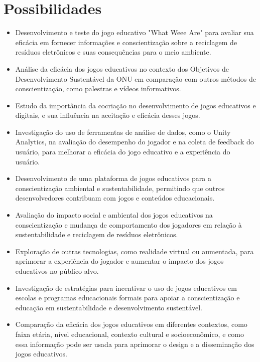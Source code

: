 \section{Possibilidades}
\begin{itemize}
    \item Desenvolvimento e teste do jogo educativo "What Weee Are" para avaliar sua eficácia em fornecer informações e conscientização sobre a reciclagem de resíduos eletrônicos e suas consequências para o meio ambiente.
    \item Análise da eficácia dos jogos educativos no contexto dos Objetivos de Desenvolvimento Sustentável da ONU em comparação com outros métodos de conscientização, como palestras e vídeos informativos.
    \item Estudo da importância da cocriação no desenvolvimento de jogos educativos e digitais, e sua influência na aceitação e eficácia desses jogos.
    \item Investigação do uso de ferramentas de análise de dados, como o Unity Analytics, na avaliação do desempenho do jogador e na coleta de feedback do usuário, para melhorar a eficácia do jogo educativo e a experiência do usuário.
    \item Desenvolvimento de uma plataforma de jogos educativos para a conscientização ambiental e sustentabilidade, permitindo que outros desenvolvedores contribuam com jogos e conteúdos educacionais.
    \item Avaliação do impacto social e ambiental dos jogos educativos na conscientização e mudança de comportamento dos jogadores em relação à sustentabilidade e reciclagem de resíduos eletrônicos.
    \item Exploração de outras tecnologias, como realidade virtual ou aumentada, para aprimorar a experiência do jogador e aumentar o impacto dos jogos educativos no público-alvo.
    \item Investigação de estratégias para incentivar o uso de jogos educativos em escolas e programas educacionais formais para apoiar a conscientização e educação em sustentabilidade e desenvolvimento sustentável.
    \item Comparação da eficácia dos jogos educativos em diferentes contextos, como faixa etária, nível educacional, contexto cultural e socioeconômico, e como essa informação pode ser usada para aprimorar o design e a disseminação dos jogos educativos.
\end{itemize}